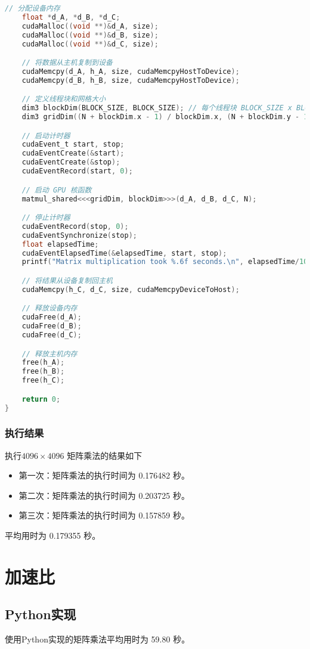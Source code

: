 \documentclass[a4paper,12pt]{ctexart}
\begin{document}
\begin{lstlisting}[language=C, caption={使用CUDA进行矩阵乘法}]
    // 分配设备内存
    float *d_A, *d_B, *d_C;
    cudaMalloc((void **)&d_A, size);
    cudaMalloc((void **)&d_B, size);
    cudaMalloc((void **)&d_C, size);

    // 将数据从主机复制到设备
    cudaMemcpy(d_A, h_A, size, cudaMemcpyHostToDevice);
    cudaMemcpy(d_B, h_B, size, cudaMemcpyHostToDevice);

    // 定义线程块和网格大小
    dim3 blockDim(BLOCK_SIZE, BLOCK_SIZE); // 每个线程块 BLOCK_SIZE x BLOCK_SIZE 个线程
    dim3 gridDim((N + blockDim.x - 1) / blockDim.x, (N + blockDim.y - 1) / blockDim.y);

    // 启动计时器
    cudaEvent_t start, stop;
    cudaEventCreate(&start);
    cudaEventCreate(&stop);
    cudaEventRecord(start, 0);

    // 启动 GPU 核函数
    matmul_shared<<<gridDim, blockDim>>>(d_A, d_B, d_C, N);

    // 停止计时器
    cudaEventRecord(stop, 0);
    cudaEventSynchronize(stop);
    float elapsedTime;
    cudaEventElapsedTime(&elapsedTime, start, stop);
    printf("Matrix multiplication took %.6f seconds.\n", elapsedTime/1000.0f);

    // 将结果从设备复制回主机
    cudaMemcpy(h_C, d_C, size, cudaMemcpyDeviceToHost);

    // 释放设备内存
    cudaFree(d_A);
    cudaFree(d_B);
    cudaFree(d_C);

    // 释放主机内存
    free(h_A);
    free(h_B);
    free(h_C);

    return 0;
}
\end{lstlisting}

\subsubsection{执行结果}
执行$4096 \times 4096$ 矩阵乘法的结果如下
\begin{itemize}
    \item 第一次：矩阵乘法的执行时间为 0.176482 秒。
    \item 第二次：矩阵乘法的执行时间为 0.203725 秒。
    \item 第三次：矩阵乘法的执行时间为 0.157859 秒。
\end{itemize}

平均用时为 0.179355 秒。

\section{加速比}
\subsection{Python实现}
使用Python实现的矩阵乘法平均用时为 59.80 秒。
\end{document}
